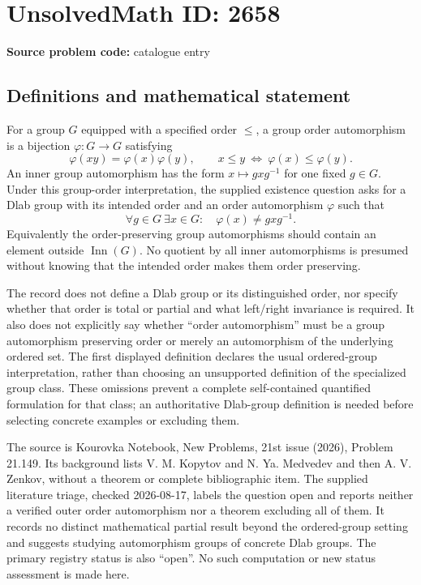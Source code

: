 \documentclass[11pt]{article}
\begin{document}
\section*{UnsolvedMath ID: 2658}
\textbf{Source problem code:} catalogue entry
\subsection{Definitions and mathematical statement}
For a group $G$ equipped with a specified order $\leq$, a group order automorphism is a bijection $\varphi:G\to G$ satisfying
\[
\varphi(xy)=\varphi(x)\varphi(y),\qquad
x\leq y\ \Longleftrightarrow\ \varphi(x)\leq\varphi(y).
\]
An inner group automorphism has the form $x\mapsto gxg^{-1}$ for one fixed $g\in G$. Under this group-order interpretation, the supplied existence question asks for a Dlab group with its intended order and an order automorphism $\varphi$ such that
\[
\forall g\in G\ \exists x\in G:\quad \varphi(x)\ne gxg^{-1}.
\]
Equivalently the order-preserving group automorphisms should contain an element outside $\operatorname{Inn}(G)$. No quotient by all inner automorphisms is presumed without knowing that the intended order makes them order preserving.

The record does not define a Dlab group or its distinguished order, nor specify whether that order is total or partial and what left/right invariance is required. It also does not explicitly say whether ``order automorphism'' must be a group automorphism preserving order or merely an automorphism of the underlying ordered set. The first displayed definition declares the usual ordered-group interpretation, rather than choosing an unsupported definition of the specialized group class. These omissions prevent a complete self-contained quantified formulation for that class; an authoritative Dlab-group definition is needed before selecting concrete examples or excluding them.

The source is Kourovka Notebook, New Problems, 21st issue (2026), Problem 21.149. Its background lists V. M. Kopytov and N. Ya. Medvedev and then A. V. Zenkov, without a theorem or complete bibliographic item. The supplied literature triage, checked 2026-08-17, labels the question open and reports neither a verified outer order automorphism nor a theorem excluding all of them. It records no distinct mathematical partial result beyond the ordered-group setting and suggests studying automorphism groups of concrete Dlab groups. The primary registry status is also ``open''. No such computation or new status assessment is made here.
\end{document}
